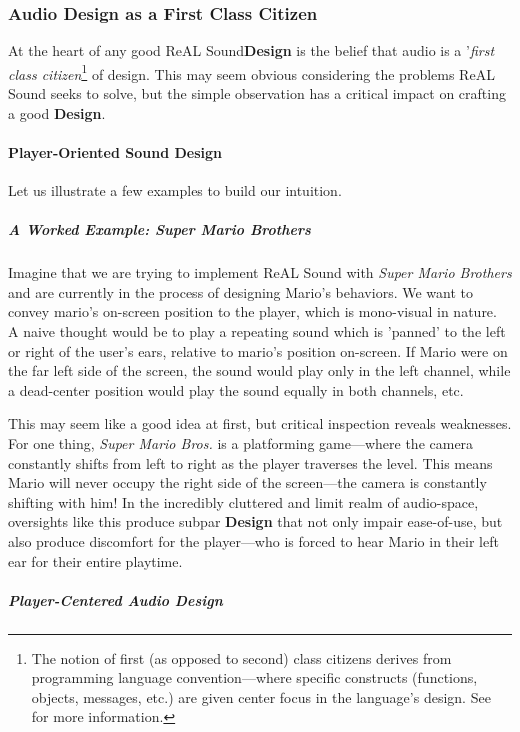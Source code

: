 \documentclass{report}
\newcommand{\rs}{ReAL Sound\xspace}
\newcommand{\design}{\textbf{Design}\xspace}
\begin{document}
\subsubsection{Audio Design as a First Class Citizen}

At the heart of any good \rs \design is the belief that audio is a '\emph{first class citizen}\footnote{The notion of first (as opposed to second) class citizens derives from programming language convention---where specific constructs (functions, objects, messages, etc.) are given center focus in the language's design. See \cite{abelsonstructure} for more information.} of design. This may seem obvious considering the problems \rs seeks to solve, but the simple observation has a critical impact on crafting a good \design.

\paragraph{Player-Oriented Sound Design}

Let us illustrate a few examples to build our intuition. 

\subparagraph{A Worked Example: \emph{Super Mario Brothers}}

Imagine that we are trying to implement \rs with \emph{Super Mario Brothers} and are currently in the process of designing Mario's behaviors. We want to convey mario's on-screen position to the player, which is mono-visual in nature. A naive thought would be to play a repeating sound which is 'panned' to the left or right of the user's ears, relative to mario's position on-screen. If Mario were on the far left side of the screen, the sound would play only in the left channel, while a dead-center position would play the sound equally in both channels, etc. 

This may seem like a good idea at first, but critical inspection reveals weaknesses. For one thing, \emph{Super Mario Bros.} is a platforming game---where the camera constantly shifts from left to right as the player traverses the level. This means Mario will never occupy the right side of the screen---the camera is constantly shifting with him! In the incredibly cluttered and limit realm of audio-space, oversights like this produce subpar \design that not only impair ease-of-use, but also produce discomfort for the player---who is forced to hear Mario in their left ear for their entire playtime.   

\subparagraph{Player-Centered Audio Design}
\end{document}
